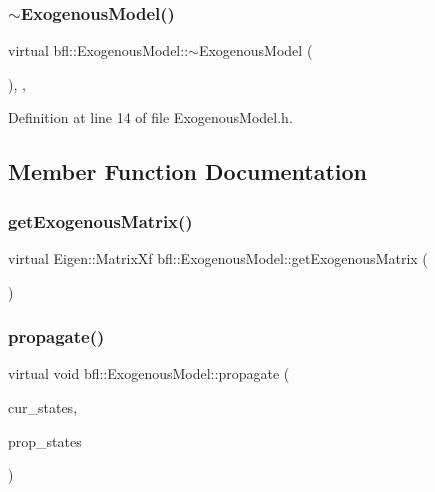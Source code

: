\subsubsection{\texorpdfstring{$\sim$\+Exogenous\+Model()}{~ExogenousModel()}}
{\footnotesize\ttfamily virtual bfl\+::\+Exogenous\+Model\+::$\sim$\+Exogenous\+Model (\begin{DoxyParamCaption}{ }\end{DoxyParamCaption})\hspace{0.3cm}{\ttfamily [inline]}, {\ttfamily [virtual]}, {\ttfamily [noexcept]}}



Definition at line 14 of file Exogenous\+Model.\+h.



\subsection{Member Function Documentation}
\mbox{\label{classbfl_1_1ExogenousModel_a3b4ab9b6b19e7e8552101cc8f8bf06f2}} 
\subsubsection{\texorpdfstring{get\+Exogenous\+Matrix()}{getExogenousMatrix()}}
{\footnotesize\ttfamily virtual Eigen\+::\+Matrix\+Xf bfl\+::\+Exogenous\+Model\+::get\+Exogenous\+Matrix (\begin{DoxyParamCaption}{ }\end{DoxyParamCaption})\hspace{0.3cm}{\ttfamily [pure virtual]}}

\mbox{\label{classbfl_1_1ExogenousModel_a68255da5e3cdde0c57effd3b8e68cadb}} 
\subsubsection{\texorpdfstring{propagate()}{propagate()}}
{\footnotesize\ttfamily virtual void bfl\+::\+Exogenous\+Model\+::propagate (\begin{DoxyParamCaption}\item[{const Eigen\+::\+Ref$<$ const Eigen\+::\+Matrix\+Xf $>$ \&}]{cur\+\_\+states,  }\item[{Eigen\+::\+Ref$<$ Eigen\+::\+Matrix\+Xf $>$}]{prop\+\_\+states }\end{DoxyParamCaption})\hspace{0.3cm}{\ttfamily [pure virtual]}}

